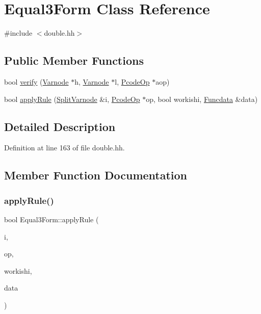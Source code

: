 \hypertarget{class_equal3_form}{}\section{Equal3\+Form Class Reference}
\label{class_equal3_form}


{\ttfamily \#include $<$double.\+hh$>$}

\subsection*{Public Member Functions}
\begin{DoxyCompactItemize}
\item 
bool \mbox{\hyperlink{class_equal3_form_a42fb0cf61a43874fa11a7087a1877eec}{verify}} (\mbox{\hyperlink{class_varnode}{Varnode}} $\ast$h, \mbox{\hyperlink{class_varnode}{Varnode}} $\ast$l, \mbox{\hyperlink{class_pcode_op}{Pcode\+Op}} $\ast$aop)
\item 
bool \mbox{\hyperlink{class_equal3_form_acfce848b702f6d1a5f7539a7975106a2}{apply\+Rule}} (\mbox{\hyperlink{class_split_varnode}{Split\+Varnode}} \&i, \mbox{\hyperlink{class_pcode_op}{Pcode\+Op}} $\ast$op, bool workishi, \mbox{\hyperlink{class_funcdata}{Funcdata}} \&data)
\end{DoxyCompactItemize}


\subsection{Detailed Description}


Definition at line 163 of file double.\+hh.



\subsection{Member Function Documentation}
\mbox{\label{class_equal3_form_acfce848b702f6d1a5f7539a7975106a2}} 
\subsubsection{\texorpdfstring{applyRule()}{applyRule()}}
{\footnotesize\ttfamily bool Equal3\+Form\+::apply\+Rule (\begin{DoxyParamCaption}\item[{\mbox{\hyperlink{class_split_varnode}{Split\+Varnode}} \&}]{i,  }\item[{\mbox{\hyperlink{class_pcode_op}{Pcode\+Op}} $\ast$}]{op,  }\item[{bool}]{workishi,  }\item[{\mbox{\hyperlink{class_funcdata}{Funcdata}} \&}]{data }\end{DoxyParamCaption})}



